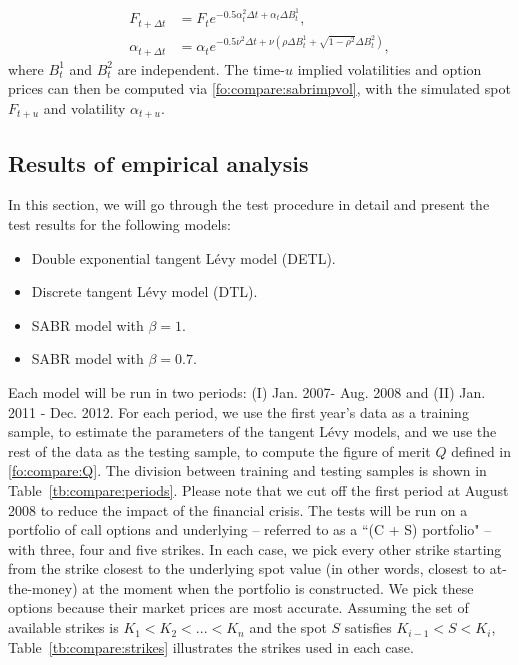 \documentclass{article}
\numberwithin{equation}{section}
\begin{document}
\begin{itemize}
\begin{align}
F_{t+\Delta t} & = F_t e^{-0.5 \alpha_t^2 \Delta t + \alpha_t \Delta B_t^1}, \nonumber\\
\alpha_{t+\Delta t} & = \alpha_t e^{-0.5 \nu^2 \Delta t + \nu(\rho \Delta B_t^1 + \sqrt{1-\rho^2} \Delta B_t^2)},
\end{align} 
where $B_t^1$ and $B_t^2$ are independent. The time-$u$ implied volatilities and option prices can then be computed via \eqref{fo:compare:sabrimpvol}, with the simulated spot $F_{t+u}$ and volatility $\alpha_{t+u}$. 
\end{itemize}





\subsection{Results of empirical analysis}
In this section, we will go through the test procedure in detail and present the test results for the following models: 
\begin{itemize}
\item Double exponential tangent L\'{e}vy model (DETL).
\item Discrete tangent L\'{e}vy model (DTL).
\item SABR model with $\beta = 1$.
\item SABR model with $\beta = 0.7$.
\end{itemize}

Each model will be run in two periods: (I) Jan. 2007- Aug. 2008 and (II) Jan. 2011 - Dec. 2012. For each period, we use the first year's data as a training sample, to estimate the parameters of the tangent L\'{e}vy models, and we use the rest of the data as the testing sample, to compute the figure of merit $Q$ defined in  \eqref{fo:compare:Q}. The division between training and testing samples is shown in Table~\ref{tb:compare:periods}. Please note that we cut off the first period at August 2008 to reduce the impact of the financial crisis.  
The tests will be run on a portfolio of call options and underlying -- referred to as a ``(C + S) portfolio" -- with three, four and five strikes. In each case, we pick every other strike starting from the strike closest to the underlying spot value (in other words, closest to at-the-money) at the moment when the portfolio is constructed. We pick these options because their market prices are most accurate. Assuming the set of available strikes is $K_1 < K_2 < ... < K_n$ and the spot $S$ satisfies $K_{i-1} < S < K_i$, Table~\ref{tb:compare:strikes} illustrates the strikes used in each case.  
\end{document}
